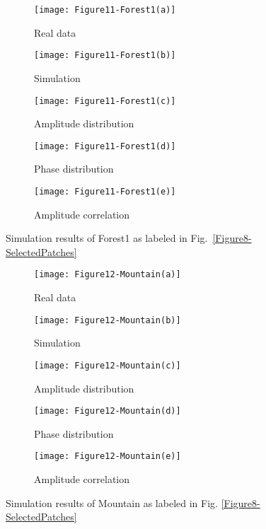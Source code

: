 \documentclass[journal]{IEEEtran}
\begin{document}
\begin{figure}[hbt]
\centering
\begin{subfigure}[t]{4 cm}
	\centering
	\texttt{[image: Figure11-Forest1(a)]}
	\caption{Real data}\label{Figure11(a)}
\end{subfigure}
\quad
\begin{subfigure}[t]{4 cm}
	\centering
	\texttt{[image: Figure11-Forest1(b)]}
	\caption{Simulation}\label{Figure11(b)}
\end{subfigure}
\quad
\begin{subfigure}[t]{4 cm}
	\centering
	\texttt{[image: Figure11-Forest1(c)]}
	\caption{Amplitude distribution}\label{Figure11(c)}
\end{subfigure}
\quad
\begin{subfigure}[t]{4 cm}
	\centering
	\texttt{[image: Figure11-Forest1(d)]}
	\caption{Phase distribution}\label{Figure11(d)}
\end{subfigure}
\quad
\begin{subfigure}[t]{8 cm}
	\centering
	\texttt{[image: Figure11-Forest1(e)]}
	\caption{Amplitude correlation}\label{Figure11(e)}
\end{subfigure}
\caption{Simulation results of Forest1 as labeled in Fig.~\ref{Figure8-SelectedPatches}}\label{Figure11}
\end{figure}

\begin{figure}[hbt]
\centering
\begin{subfigure}[t]{4 cm}
	\centering
	\texttt{[image: Figure12-Mountain(a)]}
	\caption{Real data}\label{Figure12(a)}
\end{subfigure}
\quad
\begin{subfigure}[t]{4 cm}
	\centering
	\texttt{[image: Figure12-Mountain(b)]}
	\caption{Simulation}\label{Figure12(b)}
\end{subfigure}
\quad
\begin{subfigure}[t]{4 cm}
	\centering
	\texttt{[image: Figure12-Mountain(c)]}
	\caption{Amplitude distribution}\label{Figure12(c)}
\end{subfigure}
\quad
\begin{subfigure}[t]{4 cm}
	\centering
	\texttt{[image: Figure12-Mountain(d)]}
	\caption{Phase distribution}\label{Figure12(d)}
\end{subfigure}
\quad
\begin{subfigure}[t]{8 cm}
	\centering
	\texttt{[image: Figure12-Mountain(e)]}
	\caption{Amplitude correlation}\label{Figure12(e)}
\end{subfigure}
\caption{Simulation results of Mountain as labeled in Fig. \ref{Figure8-SelectedPatches}}\label{Figure12}
\end{figure}
\end{document}
